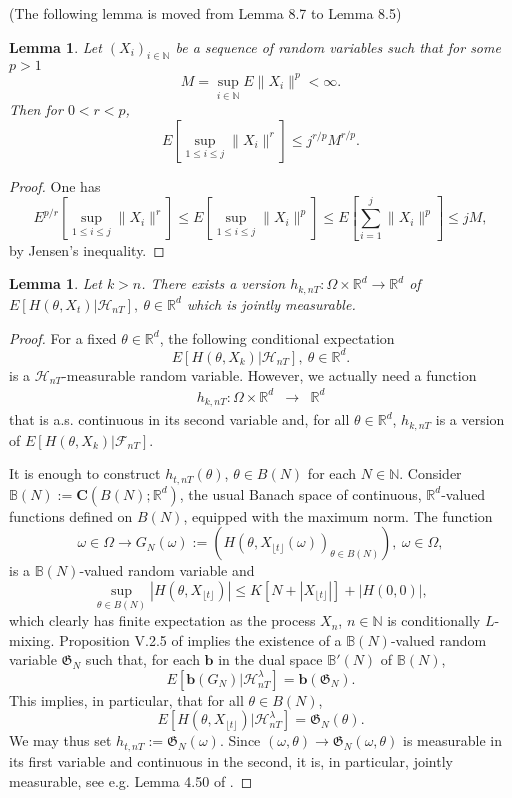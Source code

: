 \documentclass[a4paper]{article}
\newtheorem{lemma}[theorem]{Lemma}
\begin{document}
\color{red} (The following lemma is moved from Lemma 8.7 to Lemma 8.5) \color{black}
\begin{lemma}\label{maximal}
	Let $(X_i)_{i \in \mathbb{N}}$ be a sequence of random variables such that for some $p > 1$
	$$M = \sup_{i \in \mathbb{N}} E\|X_i\|^p < \infty.$$
	Then for $0 < r < p$,
	$$ E\left[ \sup_{1 \le i \le j}\|X_i\|^r \right] \le j^{r/p} M^{r/p}.$$
\end{lemma}
\begin{proof}
One has
	$$E^{p/r}\left[ \sup_{1 \le i \le j}\|X_i\|^r \right] \le E \left[ \sup_{1 \le i \le j}\|X_i\|^p \right]
\leq  E \left[ \sum_{i=1}^j \|X_i\|^p \right] \le jM,$$
by Jensen's inequality. 
\end{proof}

\begin{lemma}\label{lem_meas}
Let $k > n$. There exists a version $h_{k,nT}: \Omega \times \mathbb{R}^{d} \to \mathbb{R}^{d}$ of $E[H(\theta,X_t)\vert\mathcal{H}_{nT}],\ \theta\in\mathbb{R}^{d}$ which is jointly measurable. 
\end{lemma}
\begin{proof}
	For a fixed $\theta \in \mathbb{R}^{d}$, the following conditional expectation
	$$
	E[H(\theta,X_k)\vert\mathcal{H}_{nT}],\ \theta\in\mathbb{R}^{d}.
	$$
	is a $\mathcal{H}_{nT}$-measurable random variable. However, we actually need a function
	\begin{eqnarray}
	h_{k,nT}: \Omega \times \mathbb{R}^{d} &\to& \mathbb{R}^{d}
	\end{eqnarray}
	that is a.s. continuous in its second variable and, for all $\theta\in\mathbb{R}^{d}$,
	$h_{k,nT}$ is a version of $E[H(\theta,X_k)\vert\mathcal{F}_{nT}]$. 

It is enough to construct $h_{t,nT}(\theta)$, $\theta\in B(N)$
for each $N\in\mathbb{N}$.
Consider $\mathbb{B}(N):=\mathbf{C}(B(N);\mathbb{R}^d)$, the usual Banach space
of continuous, $\mathbb{R}^d$-valued functions defined on $B(N)$, equipped
with the maximum norm. The function 
$$
\omega\in\Omega\to G_N(\omega):=(H(\theta,X_{\lfloor t\rfloor}(\omega))_{\theta\in B(N)}),\ \omega\in\Omega,
$$
is a $\mathbb{B}(N)$-valued random variable and
$$
\sup_{\theta\in B(N)} |H(\theta,X_{\lfloor t\rfloor})|\leq K[N+|X_{\lfloor t\rfloor}|]+|H(0,0)|,
$$
which clearly has finite expectation as the process $X_n$, $n\in\mathbb{N}$ is conditionally $L$-mixing.
Proposition V.2.5 of \cite{neveu} implies the existence of a $\mathbb{B}(N)$-valued
random variable $\mathfrak{G}_N$ such that, for each $\mathbf{b}$ in the dual space $\mathbb{B}'(N)$
of $\mathbb{B}(N)$, $$
E[\mathbf{b}(G_N)\vert \mathcal{H}_{nT}^{\lambda}]=\mathbf{b}(\mathfrak{G}_N).
$$
This implies, in particular, that for all $\theta\in B(N)$,
\[
E[H(\theta,X_{\lfloor t\rfloor})\vert \mathcal{H}_{nT}^{\lambda}]=\mathfrak{G}_N(\theta).
\]
We may thus set $h_{t,nT}:=\mathfrak{G}_N(\omega)$. Since $(\omega,\theta)\to
\mathfrak{G}_N(\omega,\theta)$ is measurable in its first variable and continuous in
the second, it is, in particular, jointly measurable, see e.g. Lemma 4.50 of \cite{ab}.
\end{proof}
\end{document}
